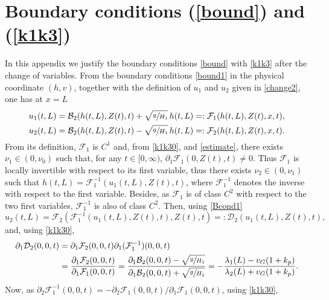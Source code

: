 \section{Boundary conditions (\ref{bound}) and (\ref{k1k3})}
\label{boundary}
In this appendix we justify the boundary conditions \eqref{bound} with \eqref{k1k3} after the change of variables. From the boundary conditions \eqref{bound1} in the physical coordinate $(h,v)$, together with the definition of $u_{1}$ and $u_{2}$
given in \eqref{change2}, one has at $x=L$
\begin{equation}
\begin{split}
u_{1}(t,L)=\mathcal{B}_{2}(h(t,L),Z(t),t)+\sqrt{\sfrac{g}{H_{1}}}\,h(t,L)=:\mathcal{F}_{1}(h(t,L),Z(t),x,t),\\
u_{2}(t,L)=\mathcal{B}_{2}(h(t,L),Z(t),t)-\sqrt{\sfrac{g}{H_{1}}}\,h(t,L)=:\mathcal{F}_{2}(h(t,L),Z(t),x,t).
\end{split}
\label{Bcond1}
\end{equation}
From its definition, $\mathcal{F}_{1}$ is $C^{1}$ and, from \eqref{k1k30}, and \eqref{estimate}, there exists $\nu_{1}\in(0,\nu_{0})$ such that, for any $t\in[0,\infty)$, $\partial_{1}{\mathcal{F}_{1}}(0,Z(t),t)\neq 0$. Thus $\mathcal{F}_{1}$ is locally invertible with respect to its first variable, thus
there exists $\nu_{2}\in(0,{\nu_{1}})$ such that
$h(t,L)=\mathcal{F}_{1}^{-1}(u_{1}(t,L),Z(t),t)$, where $\mathcal{F}_{1}^{-1}$ denotes the inverse with respect to the first variable. Besides, as $\mathcal{F}_{1}$ is of class $C^{2}$ with respect to the two first variables, $\mathcal{F}_{1}^{-1}$ is also of class $C^{2}$. Then, using \eqref{Bcond1}
\begin{equation*}
u_{2}(t,L)=\mathcal{F}_{2}(\mathcal{F}_{1}^{-1}(u_{1}(t,L),Z(t),t),Z(t),t)=:\mathcal{D}_{2}(u_{1}(t,L),Z(t),t),
\end{equation*}
and, using \eqref{k1k30},
\begin{equation*}
\begin{split}
\partial_{1}\mathcal{D}_{2}(0,0,t)&=\partial_{1}\mathcal{F}_{2}(0,0,t)\partial_{1}(\mathcal{F}_{1}^{-1})(0,0,t)\\
&=\frac{\partial_{1}\mathcal{F}_{2}(0,0,t)}{\partial_{1}\mathcal{F}_{1}(0,0,t)}=\frac{\partial_{1}\mathcal{B}_{2}(0,0,t)-\sqrt{\sfrac{g}{H_{1}}}}{\partial_{1}\mathcal{B}_{2}(0,0,t)+\sqrt{\sfrac{g}{H_{1}}}}=-\frac{\lambda_{1}(L)-v_{G}(1+k_{p})}{\lambda_{2}(L)+v_{G}(1+k_{p})}.
\end{split}
\end{equation*}
Now, as $\partial_{2}\mathcal{F}_{1}^{-1}(0,0,t)=-\partial_{2}\mathcal{F}_{1}(0,0,t)/\partial_{1}\mathcal{F}_{1}(0,0,t)$, using \eqref{k1k30},
